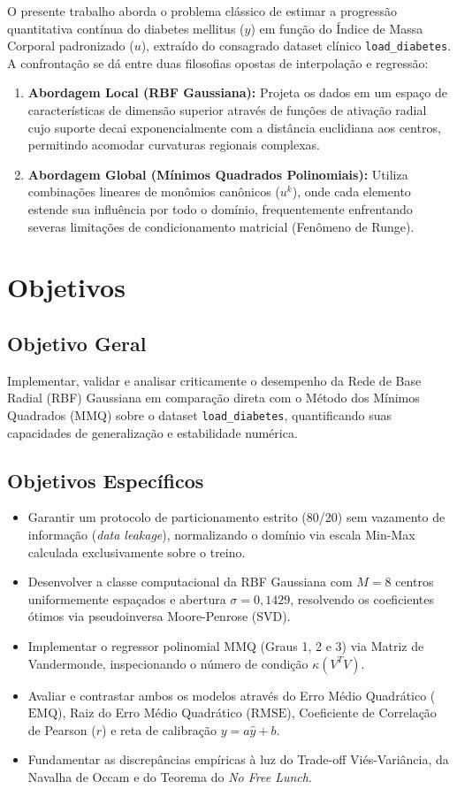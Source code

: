 \documentclass[12pt,a4paper]{article}
\begin{document}
O presente trabalho aborda o problema clássico de estimar a progressão quantitativa contínua do diabetes mellitus ($y$) em função do Índice de Massa Corporal padronizado ($u$), extraído do consagrado dataset clínico \texttt{load\_diabetes}. A confrontação se dá entre duas filosofias opostas de interpolação e regressão:
\begin{enumerate}
    \item \textbf{Abordagem Local (RBF Gaussiana):} Projeta os dados em um espaço de características de dimensão superior através de funções de ativação radial cujo suporte decai exponencialmente com a distância euclidiana aos centros, permitindo acomodar curvaturas regionais complexas.
    \item \textbf{Abordagem Global (Mínimos Quadrados Polinomiais):} Utiliza combinações lineares de monômios canônicos ($u^k$), onde cada elemento estende sua influência por todo o domínio, frequentemente enfrentando severas limitações de condicionamento matricial (Fenômeno de Runge).
\end{enumerate}

\section{Objetivos}
\subsection{Objetivo Geral}
Implementar, validar e analisar criticamente o desempenho da Rede de Base Radial (RBF) Gaussiana em comparação direta com o Método dos Mínimos Quadrados (MMQ) sobre o dataset \texttt{load\_diabetes}, quantificando suas capacidades de generalização e estabilidade numérica.

\subsection{Objetivos Específicos}
\begin{itemize}
    \item Garantir um protocolo de particionamento estrito (80/20) sem vazamento de informação (\textit{data leakage}), normalizando o domínio via escala Min-Max calculada exclusivamente sobre o treino.
    \item Desenvolver a classe computacional da RBF Gaussiana com $M=8$ centros uniformemente espaçados e abertura $\sigma = 0{,}1429$, resolvendo os coeficientes ótimos via pseudoinversa Moore-Penrose (SVD).
    \item Implementar o regressor polinomial MMQ (Graus 1, 2 e 3) via Matriz de Vandermonde, inspecionando o número de condição $\kappa(V^T V)$.
    \item Avaliar e contrastar ambos os modelos através do Erro Médio Quadrático ($\text{EMQ}$), Raiz do Erro Médio Quadrático ($\text{RMSE}$), Coeficiente de Correlação de Pearson ($r$) e reta de calibração $y = a\hat{y} + b$.
    \item Fundamentar as discrepâncias empíricas à luz do Trade-off Viés-Variância, da Navalha de Occam e do Teorema do \textit{No Free Lunch}.
\end{itemize}
\end{document}
